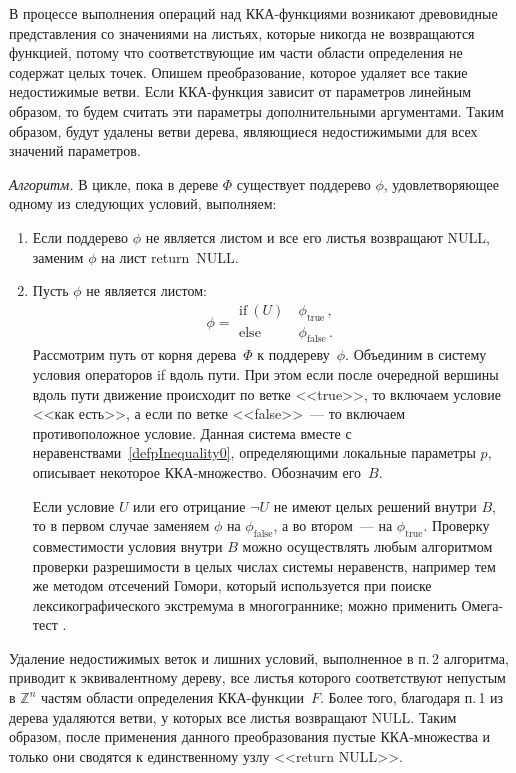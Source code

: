 \begin{multicols}{2}
В процессе выполнения операций над ККА-функ\-ци\-ями возникают
древовидные представления со значениями на листьях, которые никогда
не возвращаются функцией, потому что соответствующие им части
области определения не содержат целых точек. Опишем преобразование,
которое удаляет все такие недостижимые ветви. Если ККА-функция
зависит от параметров линейным образом, то будем считать эти
параметры дополнительными аргументами. Таким образом, будут удалены
ветви дерева, являющиеся недостижимыми для всех значений параметров.

\textit{Алгоритм.} В цикле, пока в дереве $\Phi$ существует 
поддерево $\phi$, удовлетворяющее одному из сле\-ду\-ющих условий, выполняем:
\begin{enumerate}
\item Если поддерево $\phi$ не является листом и все его листья возвращают NULL, заменим $\phi$ на лист return~NULL.
\item Пусть $\phi$ не является листом:
$$ 
\phi = 
\begin{array}{ll}
\mbox{if}\  (U) &\ \phi_{\mathrm{true}}\,,\\ 
\mbox{else} &\ \phi_{\mathrm{false}}\,.
\end{array}
$$
Рассмотрим путь от корня дерева~$\Phi$ к поддереву~$\phi$. Объединим
в систему условия операторов if вдоль пути. При этом если после
очередной вершины вдоль пути движение происходит по ветке <<true>>,
то включаем условие <<как есть>>, а если по ветке <<false>>~--- то
включаем противоположное условие. Данная система вместе с
неравенствами~\eqref{defpInequality0}, определяющими локальные
параметры $p$, описывает некоторое ККА-мно\-же\-ст\-во. Обозначим его~$B$.

Если условие $U$ или его отрицание $\neg U$ не имеют целых решений
внутри $B$, то в первом случае заменяем $\phi$ на
$\phi_{\mathrm{false}}$, а во втором~--- на $\phi_{\mathrm{true}}$.
Проверку совместимости условия внутри $B$ можно осуществлять любым
алгоритмом проверки разрешимости в целых числах системы неравенств,
например тем же методом отсечений Гомори, который используется при
поиске лексикографического экстремума в многограннике; можно
применить Омега-тест \cite{Pugh}.
\end{enumerate}
Удаление недостижимых веток и лишних условий, выполненное в п.\,2
алгоритма, приводит к эквивалентному дереву, все листья которого
соответствуют непустым в $\mathbb{Z}^n$ частям области определения
ККА-функ\-ции~$F$. Более того, благодаря п.\,1 из дерева удаляются
ветви, у которых все листья возвращают NULL. Таким образом, после
применения данного преобразования пустые ККА-множества и только они
сводятся к единственному узлу <<return NULL>>.


\end{multicols}
